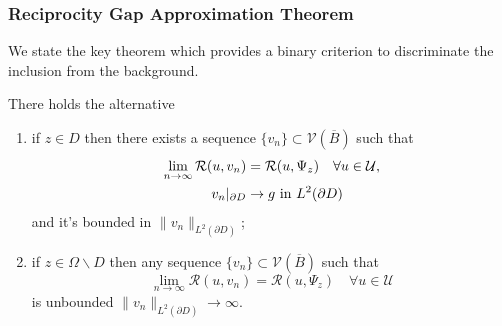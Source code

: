 \documentclass[10pt,xcolor={dvipsnames}]{beamer}
\theoremstyle{plain}
\theoremstyle{plain}
\begin{document}
\begin{frame}
 \frametitle{Reciprocity Gap Approximation Theorem}
 {\footnotesize
 We state the key theorem which provides a binary criterion to discriminate the inclusion from the background.}
\begin{theorem}
 \label{theo:approximation-rg} 
There holds the alternative
 \begin{enumerate}
  \item if $z \in D$ then there exists a sequence $\{v_n\} \subset \mathcal{V}(\overline{B})$ such that
   \begin{align}
     \lim_{n\to\infty}\mathcal{R}(u,v_n) &= \mathcal{R}(u,\Psi_z)\quad\forall u\in\mathcal{U},\label{eq:rg-lim-constructive}\\
     v_n|_{\partial D}&\to g \textup{ in } L^2(\partial D)
   \end{align}
   and it's bounded in $\|v_n\|_{L^2(\partial D)}$;
  \item if $z \in \Omega \backslash D$ then any sequence $\{v_n\} \subset \mathcal{V}(\overline{B})$ such that
   \begin{equation}
     \lim_{n\to\infty}\mathcal{R}(u,v_n) = \mathcal{R}(u,\Psi_z)\quad\forall u\in\mathcal{U}\label{eq:rg-lim-counterpart}
   \end{equation}
   is unbounded $\|v_n\|_{L^2(\partial D)}\to\infty$.
 \end{enumerate}
\end{theorem}
\end{frame}
\end{document}
